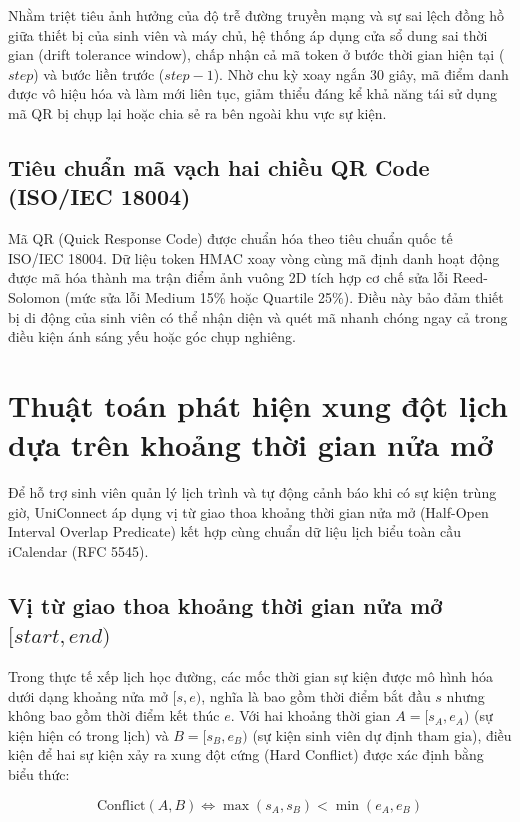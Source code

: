 Nhằm triệt tiêu ảnh hưởng của độ trễ đường truyền mạng và sự sai lệch đồng hồ giữa thiết bị của sinh viên và máy chủ, hệ thống áp dụng cửa sổ dung sai thời gian (drift tolerance window), chấp nhận cả mã token ở bước thời gian hiện tại ($step$) và bước liền trước ($step - 1$). Nhờ chu kỳ xoay ngắn 30 giây, mã điểm danh được vô hiệu hóa và làm mới liên tục, giảm thiểu đáng kể khả năng tái sử dụng mã QR bị chụp lại hoặc chia sẻ ra bên ngoài khu vực sự kiện.

\subsection{Tiêu chuẩn mã vạch hai chiều QR Code (ISO/IEC 18004)}

Mã QR (Quick Response Code) được chuẩn hóa theo tiêu chuẩn quốc tế ISO/IEC 18004\cite{iso18004qr}. Dữ liệu token HMAC xoay vòng cùng mã định danh hoạt động được mã hóa thành ma trận điểm ảnh vuông 2D tích hợp cơ chế sửa lỗi Reed-Solomon (mức sửa lỗi Medium 15\% hoặc Quartile 25\%). Điều này bảo đảm thiết bị di động của sinh viên có thể nhận diện và quét mã nhanh chóng ngay cả trong điều kiện ánh sáng yếu hoặc góc chụp nghiêng.

\section{Thuật toán phát hiện xung đột lịch dựa trên khoảng thời gian nửa mở}

Để hỗ trợ sinh viên quản lý lịch trình và tự động cảnh báo khi có sự kiện trùng giờ, UniConnect áp dụng vị từ giao thoa khoảng thời gian nửa mở (Half-Open Interval Overlap Predicate) kết hợp cùng chuẩn dữ liệu lịch biểu toàn cầu iCalendar (RFC 5545)\cite{desruisseaux2009ical}.

\subsection{Vị từ giao thoa khoảng thời gian nửa mở $[start, end)$}

Trong thực tế xếp lịch học đường, các mốc thời gian sự kiện được mô hình hóa dưới dạng khoảng nửa mở $[s, e)$, nghĩa là bao gồm thời điểm bắt đầu $s$ nhưng không bao gồm thời điểm kết thúc $e$. Với hai khoảng thời gian $A = [s_A, e_A)$ (sự kiện hiện có trong lịch) và $B = [s_B, e_B)$ (sự kiện sinh viên dự định tham gia), điều kiện để hai sự kiện xảy ra xung đột cứng (Hard Conflict) được xác định bằng biểu thức:

\begin{equation}
\text{Conflict}(A, B) \iff \max(s_A, s_B) < \min(e_A, e_B)
\end{equation}

